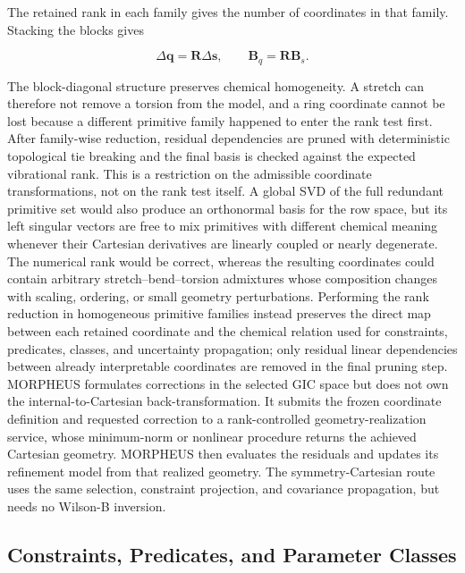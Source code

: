 \documentclass[aip,jcp,reprint,longbibliography,floatfix]{revtex4-2}
\begin{document}
The retained rank in each family gives the number of coordinates in that
family. Stacking the blocks gives

\begin{equation}
\Delta \mathbf{q}
=
\mathbf{R}
\Delta \mathbf{s},
\qquad
\mathbf{B}_{q}
=
\mathbf{R}
\mathbf{B}_s .
\end{equation}

The block-diagonal structure preserves chemical homogeneity. A stretch can
therefore not remove a torsion from the model, and a ring coordinate cannot be
lost because a different primitive family happened to enter the rank test
first. After family-wise reduction, residual dependencies are pruned with
deterministic topological tie breaking and the final basis is checked against
the expected vibrational rank.
This is a restriction on the admissible coordinate transformations, not on the
rank test itself. A global SVD of the full redundant primitive set would also
produce an orthonormal basis for the row space, but its left singular vectors
are free to mix primitives with different chemical meaning whenever their
Cartesian derivatives are linearly coupled or nearly degenerate. The numerical
rank would be correct, whereas the resulting coordinates could contain
arbitrary stretch--bend--torsion admixtures whose composition changes with
scaling, ordering, or small geometry perturbations. Performing the rank
reduction in homogeneous primitive families instead preserves the direct map
between each retained coordinate and the chemical relation used for
constraints, predicates, classes, and uncertainty propagation; only residual
linear dependencies between already interpretable coordinates are removed in
the final pruning step.
MORPHEUS formulates corrections in the selected GIC space but does not own the
internal-to-Cartesian back-transformation. It submits the frozen coordinate
definition and requested correction to a rank-controlled geometry-realization
service, whose minimum-norm or nonlinear procedure returns the achieved Cartesian
geometry. MORPHEUS then evaluates the residuals and updates its refinement
model from that realized geometry. The symmetry-Cartesian route uses the same
selection, constraint projection, and covariance propagation, but needs no
Wilson-B inversion.


\subsection{Constraints, Predicates, and Parameter Classes}
\end{document}
